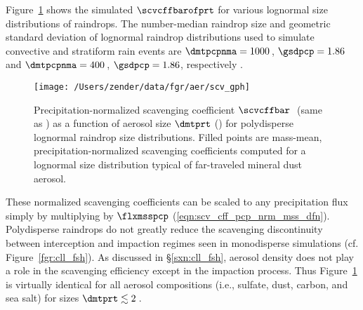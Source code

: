 \documentclass[12pt,twoside]{book}
\begin{document}
Figure~\ref{fgr:scv_cff_mss_nrm} shows the simulated $\scvcffbarofprt$ 
for various lognormal size distributions of raindrops.
The number-median raindrop size and geometric standard deviation of 
lognormal raindrop distributions used to simulate convective and
stratiform rain events are $\dmtpcpnma = 1000$\,\um, $\gsdpcp = 1.86$
and $\dmtpcpnma = 400$\,\um, $\gsdpcp = 1.86$, respectively
\cite[]{NGD94}. 
\begin{figure*}
\begin{center}
\texttt{[image: /Users/zender/data/fgr/aer/scv\_gph]}\vfill
\end{center}
\caption[Scavenging coefficient for polydisperse raindrops]{
Precipitation-normalized scavenging coefficient 
$\scvcffbar$\,\xmm\ (same as \mSxkg) as a function of
aerosol size $\dmtprt$ (\um) for polydisperse lognormal raindrop size  
distributions.  
Filled points are mass-mean, precipitation-normalized scavenging
coefficients computed for a lognormal size distribution typical of
far-traveled mineral dust aerosol.
\label{fgr:scv_cff_mss_nrm}}
\end{figure*}
These normalized scavenging coefficients can be scaled to any
precipitation flux simply by multiplying by $\flxmsspcp$
(\ref{eqn:scv_cff_pcp_nrm_mss_dfn}). 
Polydisperse raindrops do not greatly reduce the scavenging
discontinuity between interception and impaction regimes seen in
monodisperse simulations (cf. Figure~\ref{fgr:cll_fsh}).
As discussed in \S\ref{sxn:cll_fsh}, aerosol density does not play 
a role in the scavenging efficiency except in the impaction process. 
Thus Figure~\ref{fgr:scv_cff_mss_nrm} is virtually identical for all
aerosol compositions (i.e., sulfate, dust, carbon, and sea salt) for
sizes $\dmtprt \lesssim 2$\,\um.  
\end{document}
